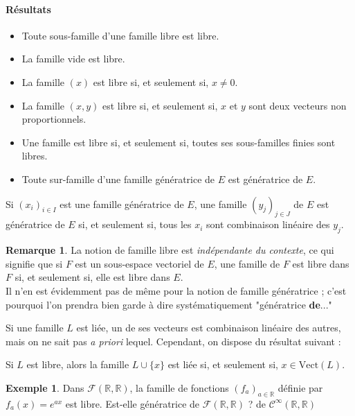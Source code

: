 \documentclass[french]{article}
\newcommand{\R}{\mathbb{R}}
\newcommand{\Vect}{\text{Vect}}
\theoremstyle{plain}
\theoremstyle{definition}
\newtheorem*{ex}{Exemple}
\newtheorem*{rmq}{Remarque}
\theoremstyle{remark}
\begin{document}
\paragraph{Résultats}
\begin{itemize}
	\item Toute sous-famille d'une famille libre est libre.
	\item La famille vide est libre.
	\item La famille $(x)$ est libre si, et seulement si, $x\ne 0$.
	\item La famille $(x,y)$ est libre si, et seulement si, $x$ et $y$ sont deux vecteurs non proportionnels.
	\item Une famille est libre si, et seulement si, toutes ses sous-familles finies sont libres.
	\item Toute sur-famille d'une famille génératrice de $E$ est génératrice de $E$.
\end{itemize}

\begin{met}
	Si $(x_i)_{i\in I}$ est une famille génératrice de $E$, une famille $(y_j)_{j\in J}$ de $E$ est génératrice de $E$ si, et seulement si, tous les $x_i$ sont combinaison linéaire des $y_j$. 
\end{met}

\begin{rmq}
	La notion de famille libre est \textit{indépendante du contexte}, ce qui signifie que si $F$ est un sous-espace vectoriel de $E$, une famille de $F$ est libre dans $F$ si, et seulement si, elle est libre dans $E$. \\
	Il n'en est évidemment pas de même pour la notion de famille génératrice ; c'est pourquoi l'on prendra bien garde à dire systématiquement "génératrice \textbf{de}..."
\end{rmq}

Si une famille $L$ est liée, un de ses vecteurs est combinaison linéaire des autres, mais on ne sait pas \textit{a priori} lequel. Cependant, on dispose du résultat suivant :

\begin{lem}
	Si $L$ est libre, alors la famille $L\cup\{x\}$ est liée si, et seulement si, $x\in\Vect(L)$.
\end{lem}

\begin{ex}
	Dans $\mathcal{F}(\R,\R)$, la famille de fonctions $(f_a)_{a\in\R}$ définie par $f_a(x)=e^{ax}$ est libre. Est-elle génératrice de $\mathcal{F}(\R,\R)$ ? de $\mathcal{C}^\infty(\R,\R)$
\end{ex}
\end{document}
